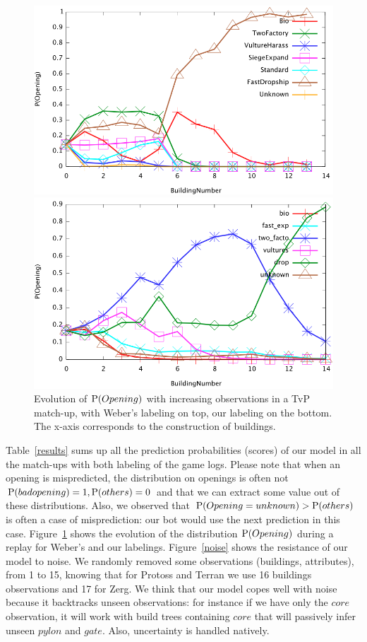 \begin{figure}[htp]
\centerline{\includegraphics[width=0.8\columnwidth]{images/TvP_prediction.png}}
\centerline{\includegraphics[width=0.8\columnwidth]{images/TvPx_prediction.png}}
\caption{Evolution of $\mathrm{P}(Opening)$ with increasing observations in a TvP match-up, with Weber's labeling on top, our labeling on the bottom. The x-axis corresponds to the construction of buildings.}
\label{prediction}
\end{figure}

Table~\ref{results} sums up all the prediction probabilities (scores) of our model in all the match-ups with both labeling of the game logs. Please note that when an opening is mispredicted, the distribution on openings is often not $\mathrm{P}(badopening)=1, \mathrm{P}(others)=0$ and that we can extract some value out of these distributions. Also, we observed that $\mathrm{P}(Opening=unknown)>\mathrm{P}(others)$ is often a case of misprediction: our bot would use the next prediction in this case. Figure~\ref{prediction} shows the evolution of the distribution $\mathrm{P}(Opening)$ during a replay for Weber's and our labelings. Figure~\ref{noise} shows the resistance of our model to noise. We randomly removed some observations (buildings, attributes), from 1 to 15, knowing that for Protoss and Terran we use 16 buildings observations and 17 for Zerg. We think that our model copes well with noise because it backtracks unseen observations: for instance if we have only the $core$ observation, it will work with build trees containing $core$ that will passively infer unseen $pylon$ and $gate$. Also, uncertainty is handled natively.



